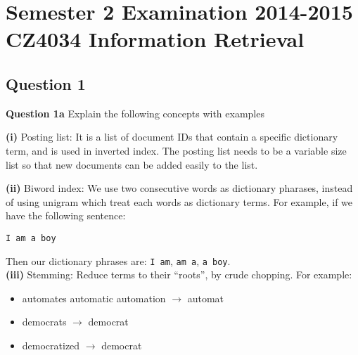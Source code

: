 \documentclass[11pt,a4paper]{report}
\begin{document}
\chapter{Semester 2 Examination 2014-2015\\CZ4034 Information Retrieval}

\begin{multicols*}{2}

\section{Question 1}
\noindent \textbf{Question 1a} Explain the following concepts with examples

\noindent \textbf{(i)} Posting list: It is a list of document IDs that contain a specific dictionary term, and is used in inverted index. The posting list needs to be a variable size list so that new documents can be added easily to the list. 

\begin{center}
\end{center}

\noindent \textbf{(ii)} Biword index: We use two consecutive words as dictionary pharases, instead of using unigram which treat each words as dictionary terms. For example, if we have the following sentence:
\begin{center}
\verb|I am a boy|
\end{center}
\noindent Then our dictionary phrases are: \verb|I am|, \verb|am a|, \verb|a boy|. \\

\noindent \textbf{(iii)} Stemming: Reduce terms to their “roots”, by crude chopping. For example:
\begin{itemize}
    \item automates automatic automation $\rightarrow$ automat
    \item democrats $\rightarrow$ democrat
    \item democratized $\rightarrow$ democrat
\end{itemize} 


\end{multicols*}
\end{document}
